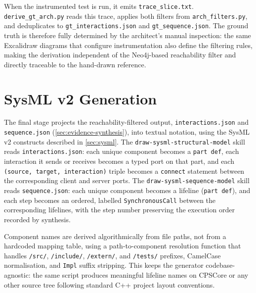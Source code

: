 When the instrumented test is run, it emits
\texttt{trace\_slice.txt}. \texttt{derive\_gt\_arch.py} reads this
trace, applies both filters from \texttt{arch\_filters.py}, and
deduplicates to \texttt{gt\_interactions.json} and
\texttt{gt\_sequence.json}. The ground truth is therefore fully
determined by the architect's manual inspection: the same Excalidraw
diagrams that configure instrumentation also define the filtering
rules, making the derivation independent of the Neo4j-based reachability filter and directly traceable to the
hand-drawn reference.

\section{SysML v2 Generation}\label{sec:sysml-generation}

The final stage projects the reachability-filtered output,
\texttt{interactions.json}
and \texttt{sequence.json} (\cref{sec:evidence-synthesis}), into \sysml
textual notation, using the SysML v2 constructs described in
\cref{sec:sysml}. The \texttt{draw-sysml-structural-model} skill reads
\texttt{interactions.json}: each unique component becomes a \texttt{part
def}, each interaction it sends or receives becomes a typed port on that
part, and each \texttt{(source, target, interaction)} triple becomes a
\texttt{connect} statement between the corresponding client and server
ports. The \texttt{draw-sysml-sequence-model} skill reads
\texttt{sequence.json}: each unique component becomes a lifeline
(\texttt{part def}), and each step becomes an ordered, labelled
\texttt{SynchronousCall} between the corresponding lifelines, with the
step number preserving the execution order recorded by synthesis.

Component names are derived algorithmically from file paths, not from a
hardcoded mapping table, using a path-to-component resolution function
that handles \texttt{/src/}, \texttt{/include/}, \texttt{/extern/}, and
\texttt{/tests/} prefixes, CamelCase normalisation, and \texttt{Impl}
suffix stripping. This keeps the generator codebase-agnostic: the same
script produces meaningful lifeline names on CPSCore or any other source
tree following standard C++ project layout conventions.

